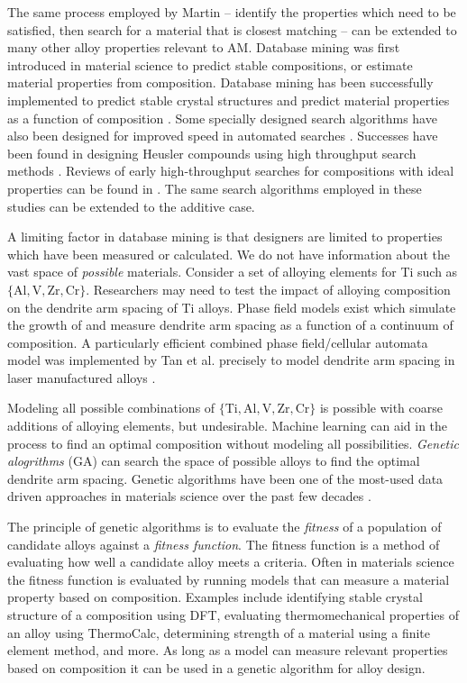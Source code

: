 The same process employed by Martin -- identify the properties which need to be satisfied, then search for a material that is closest matching -- can be extended to many other alloy properties relevant to AM. Database mining was first introduced in material science to predict stable compositions, or estimate material properties from composition. Database mining has been successfully implemented to predict stable crystal structures \cite{Franceschetti1999, Fischer2006, Oganov2006} and predict material properties as a function of composition \cite{Ikeda1997, Gopakumar2018, Wu2018, Kirklin2013, Setyawan2011}. Some specially designed search algorithms have also been designed for improved speed in automated searches \cite{Wolf2000}. Successes have been found in designing Heusler compounds using high throughput search methods \cite{Roy2012}. Reviews of early high-throughput searches for compositions with ideal properties can be found in \cite{Gilmer1998, Koinuma2004}. The same search algorithms employed in these studies can be extended to the additive case.

A limiting factor in database mining is that designers are limited to properties which have been measured or calculated. We do not have information about the vast space of \textit{possible} materials. Consider a set of alloying elements for Ti such as $\{\text{Al}, \text{V}, \text{Zr}, \text{Cr}\}$. Researchers may need to test the impact of alloying composition on the dendrite arm spacing of Ti alloys. Phase field models exist which simulate the growth of and measure dendrite arm spacing as a function of a continuum of composition. A particularly efficient combined phase field/cellular automata model was implemented by Tan et al. precisely to model dendrite arm spacing in laser manufactured alloys \cite{Tan2011}. 

Modeling all possible combinations of $\{\text{Ti},\text{Al}, \text{V}, \text{Zr}, \text{Cr}\}$ is possible with coarse additions of alloying elements, but undesirable. Machine learning can aid in the process to find an optimal composition without modeling all possibilities. \textit{Genetic alogrithms} (GA) can search the space of possible alloys to find the optimal dendrite arm spacing. Genetic algorithms have been one of the most-used data driven approaches in materials science over the past few decades \cite{Morris1996, Ho1998, Wolf2000, Johannesson2002, Stucke2003, Hart2005, Oganov2006}.

The principle of genetic algorithms is to evaluate the \textit{fitness} of a population of candidate alloys against a \textit{fitness function}. The fitness function is a method of evaluating how well a candidate alloy meets a criteria. Often in materials science the fitness function is evaluated by running models that can measure a material property based on composition. Examples include identifying stable crystal structure of a composition using DFT, evaluating thermomechanical properties of an alloy using ThermoCalc, determining strength of a material using a finite element method, and more. As long as a model can measure relevant properties based on composition it can be used in a genetic algorithm for alloy design.

